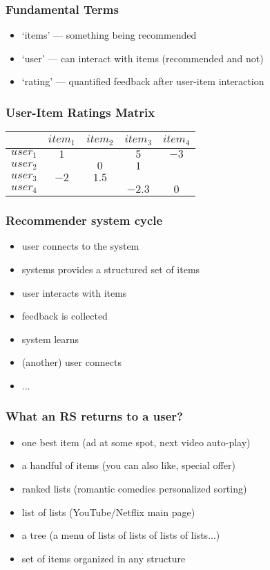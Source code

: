 \documentclass[t]{beamer}
\begin{document}
\begin{frame}
  \frametitle{Fundamental Terms}
  \begin{itemize}
  \item `items' --- something being recommended
  \item `user' --- can interact with items (recommended and not)
  \item `rating' --- quantified feedback after user-item interaction
  \end{itemize}
\end{frame}
\begin{frame}
  \frametitle{User-Item Ratings Matrix}
\begin{center}
\begin{tabular}{ |c|c|c|c|c| }
 \hline
 & $item_1$ & $item_2$ & $item_3$ & $item_4$\\
 \hline
 $user_1$ & $1$ & & $5$ & $-3$\\
 \hline
 $user_2$ & & $0$ & $1$ &\\
 \hline
 $user_3$ & $-2$ & $1.5$ & &\\
 \hline
 $user_4$ & & & $-2.3$ & $0$\\
 \hline
\end{tabular}
\end{center}
\end{frame}
\begin{frame}
  \frametitle{Recommender system cycle}
  \begin{itemize}
  \item user connects to the system
  \item systems provides a structured set of items
  \item user interacts with items
  \item feedback is collected
  \item system learns
  \item (another) user connects
  \item ...
  \end{itemize}
\end{frame}
\begin{frame}
  \frametitle{What an RS returns to a user?}
  \begin{itemize}
  \item one best item (ad at some spot, next video auto-play)
  \item a handful of items (you can also like, special offer)
  \item ranked lists (romantic comedies personalized sorting)
  \item list of lists (YouTube/Netflix main page)
  \item a tree (a menu of lists of lists of lists of lists...)
  \item set of items organized in any structure
  \end{itemize}
\end{frame}
\end{document}
